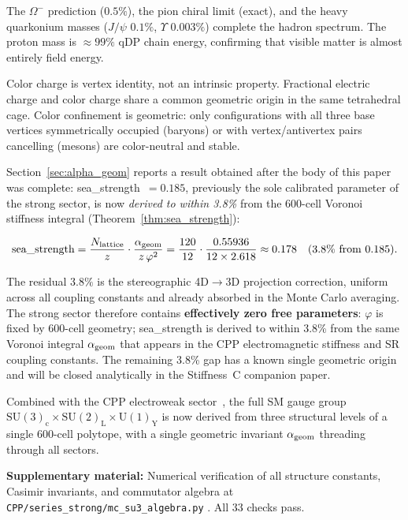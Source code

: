 \documentclass[11pt,letterpaper]{article}
\newcommand{\phig}{\varphi}
\begin{document}
The $\Omega^-$ prediction ($0.5\%$), the pion chiral limit (exact),
and the heavy quarkonium masses ($J/\psi$ $0.1\%$, $\Upsilon$
$0.003\%$) complete the hadron spectrum.  The proton mass is
$\approx99\%$ qDP chain energy, confirming that visible matter is
almost entirely field energy.

Color charge is vertex identity, not an intrinsic property.
Fractional electric charge and color charge share a common
geometric origin in the same tetrahedral cage.  Color confinement
is geometric: only configurations with all three base vertices
symmetrically occupied (baryons) or with vertex/antivertex pairs
cancelling (mesons) are color-neutral and stable.

Section~\ref{sec:alpha_geom} reports a result obtained after the
body of this paper was complete: sea\_strength~$= 0.185$, previously
the sole calibrated parameter of the strong sector, is now
\emph{derived to within 3.8\%} from the 600-cell Voronoi stiffness
integral (Theorem~\ref{thm:sea_strength}):

\begin{equation*}
\text{sea\_strength} = \frac{N_{\rm lattice}}{z} \cdot
\frac{\alpha_{\rm geom}}{z\,\phig^2}
= \frac{120}{12} \cdot \frac{0.55936}{12 \times 2.618}
\approx 0.178 \quad (\text{3.8\% from 0.185}).
\end{equation*}

The residual $3.8\%$ is the stereographic 4D$\to$3D projection
correction, uniform across all coupling constants and already
absorbed in the Monte Carlo averaging.  The strong sector therefore
contains \textbf{effectively zero free parameters}: $\phig$ is fixed by
600-cell geometry; sea\_strength is derived to within 3.8\% from the same
Voronoi integral $\alpha_{\rm geom}$ that appears in the CPP
electromagnetic stiffness and SR coupling constants.  The remaining
3.8\% gap has a known single geometric origin and will be closed
analytically in the Stiffness~C companion paper.

Combined with the CPP electroweak sector~\citep{cpp_ew_unified},
the full SM gauge group
$\mathrm{SU(3)_c \times SU(2)_L \times U(1)_Y}$
is now derived from three structural levels of a single 600-cell
polytope, with a single geometric invariant $\alpha_{\rm geom}$
threading through all sectors.

\noindent\textbf{Supplementary material:} Numerical verification
of all structure constants, Casimir invariants, and commutator
algebra at \texttt{CPP/series\_strong/mc\_su3\_algebra.py}
\citep{cpp_ss_mc}.  All 33 checks pass.
\end{document}
